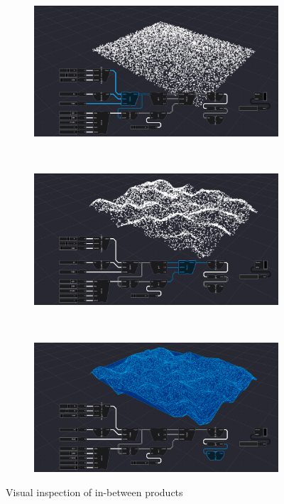 \graphicspath{{../../assets/images/6/demo/}}

\begin{figure}
  \centering
  \begin{subfigure}[b]{0.90\linewidth}
    \centering
    \includegraphics[width=\linewidth]{products-1.PNG}
    \caption{}\label{fig:in-between-products:a}
  \end{subfigure}%
  \\ 
  \begin{subfigure}[b]{0.90\linewidth}
    \centering
    \includegraphics[width=\linewidth]{products-2.PNG}
    \caption{}\label{fig:in-between-products:b}
  \end{subfigure}%
  \\
  \begin{subfigure}[b]{0.90\linewidth}
    \centering
    \includegraphics[width=\linewidth]{products-3.PNG}
    \caption{}\label{fig:in-between-products:c}
  \end{subfigure}%
  \caption[Types of \ac{vpl}s]{Visual inspection of in-between products}%
  \label{fig:in-between-products}
\end{figure}

